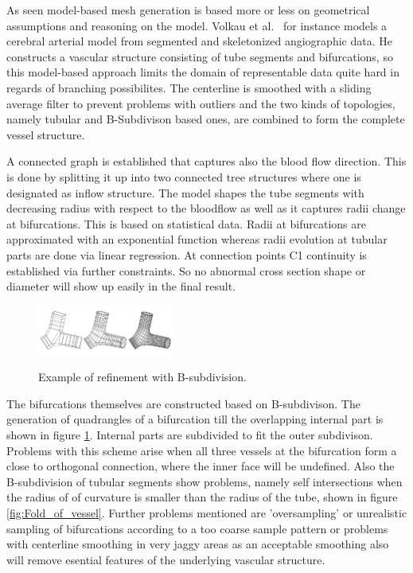As seen model-based mesh generation is based more or less on geometrical assumptions and reasoning on the model.
Volkau et al.~\cite{volkau2005geometric} for instance models a cerebral arterial model from segmented and skeletonized angiographic data. He constructs a vascular structure consisting of tube segments and bifurcations, so this model-based approach limits the domain of representable data quite hard in regards of branching possibilites. The centerline is smoothed with a sliding average filter to prevent problems with outliers and the two kinds of topologies, namely tubular and B-Subdivison based ones, are combined to form the complete vessel structure.

A connected graph is established that captures also the blood flow direction. This is done by splitting it up into two connected tree structures where one is designated as inflow structure. The model shapes the tube segments with decreasing radius with respect to the bloodflow as well as it captures radii change at bifurcations. This is based on statistical data. Radii at bifurcations are approximated with an exponential function whereas radii evolution at tubular parts are done via linear regression. At connection points C1 continuity is established via further constraints. So no abnormal cross section shape or diameter will show up easily in the final result.

\begin{figure}[h]
	\centering
	\includegraphics[width=0.4\textwidth]{./Images/B-subdivision_refinement.png} \\
	\caption{Example of refinement with B-subdivision.}
	\cite{volkau2005geometric}
	\label{fig:B-subdivision_refinement}
\end{figure}

The bifurcations themselves are constructed based on B-subdivison. The generation of quadrangles of a bifurcation till the overlapping internal part is shown in figure \ref{fig:B-subdivision_refinement}. Internal parts are subdivided to fit the outer subdivison. Problems with this scheme arise when all three vessels at the bifurcation form a close to orthogonal connection, where the inner face will be undefined. Also the B-subdivision of tubular segments show problems, namely self intersections when the radius of of curvature is smaller than the radius of the tube, shown in figure \ref{fig:Fold_of_vessel}.
Further problems mentioned are 'oversampling' or unrealistic sampling of bifurcations according to a too coarse sample pattern or problems with centerline smoothing in very jaggy areas as an acceptable smoothing also will remove esential features of the underlying vascular structure.  

